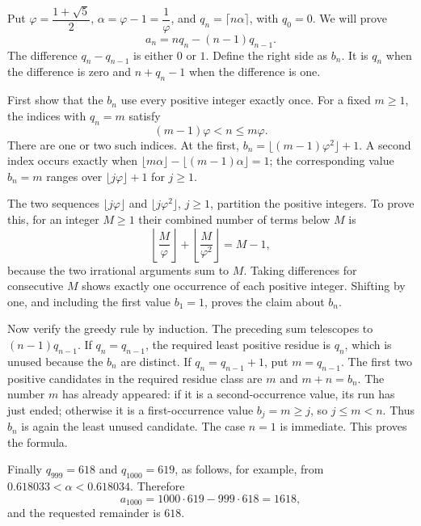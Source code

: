 Put $\varphi=\dfrac{1+\sqrt5}{2}$, $\alpha=\varphi-1=\dfrac{1}{\varphi}$, and $q_n=\lceil n\alpha\rceil$, with $q_0=0$. We will prove
\[
a_n=nq_n-(n-1)q_{n-1}.
\]
The difference $q_n-q_{n-1}$ is either $0$ or $1$. Define the right side as $b_n$. It is $q_n$ when the difference is zero and $n+q_n-1$ when the difference is one.

First show that the $b_n$ use every positive integer exactly once. For a fixed $m\ge1$, the indices with $q_n=m$ satisfy
\[
(m-1)\varphi<n\le m\varphi.
\]
There are one or two such indices. At the first, $b_n=\lfloor(m-1)\varphi^2\rfloor+1$. A second index occurs exactly when
$\lfloor m\alpha\rfloor-\lfloor(m-1)\alpha\rfloor=1$; the corresponding value $b_n=m$ ranges over $\lfloor j\varphi\rfloor+1$ for $j\ge1$.

The two sequences $\lfloor j\varphi\rfloor$ and $\lfloor j\varphi^2\rfloor$, $j\ge1$, partition the positive integers. To prove this, for an integer $M\ge1$ their combined number of terms below $M$ is
\[
\left\lfloor\dfrac{M}{\varphi}\right\rfloor+
\left\lfloor\dfrac{M}{\varphi^2}\right\rfloor=M-1,
\]
because the two irrational arguments sum to $M$. Taking differences for consecutive $M$ shows exactly one occurrence of each positive integer. Shifting by one, and including the first value $b_1=1$, proves the claim about $b_n$.

Now verify the greedy rule by induction. The preceding sum telescopes to $(n-1)q_{n-1}$. If $q_n=q_{n-1}$, the required least positive residue is $q_n$, which is unused because the $b_n$ are distinct. If $q_n=q_{n-1}+1$, put $m=q_{n-1}$. The first two positive candidates in the required residue class are $m$ and $m+n=b_n$. The number $m$ has already appeared: if it is a second-occurrence value, its run has just ended; otherwise it is a first-occurrence value $b_j=m\ge j$, so $j\le m<n$. Thus $b_n$ is again the least unused candidate. The case $n=1$ is immediate. This proves the formula.

Finally $q_{999}=618$ and $q_{1000}=619$, as follows, for example, from $0.618033<\alpha<0.618034$. Therefore
\[
a_{1000}=1000\cdot619-999\cdot618=1618,
\]
and the requested remainder is $\boxed{618}$.
